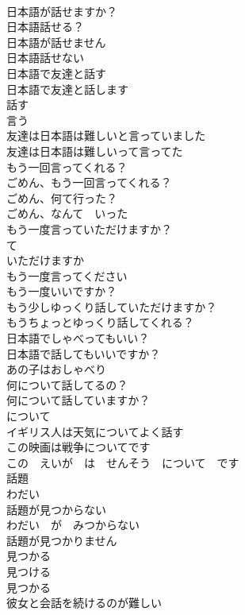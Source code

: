 \documentclass[8pt]{extreport}
\begin{document}
\begin{CJK}{UTF8}{min}
\\	日本語が話せますか？	
\\	日本語話せる？	
\\	日本語が話せません	
\\	日本語話せない	
\\	日本語で友達と話す	
\\	日本語で友達と話します	
\\	話す	
\\	言う	
\\	友達は日本語は難しいと言っていました	
\\	友達は日本語は難しいって言ってた	
\\	もう一回言ってくれる？	
\\	ごめん、もう一回言ってくれる？	
\\	ごめん、何て行った？	
\\	ごめん、なんて　いった
\\	もう一度言っていただけますか？	
\\	て
\\	いただけますか 
\\	もう一度言ってください	
\\	もう一度いいですか？	
\\	もう少しゆっくり話していただけますか？	
\\	もうちょっとゆっくり話してくれる？	
\\	日本語でしゃべってもいい？	
\\	日本語で話してもいいですか？	
\\	あの子はおしゃべり	
\\	何について話してるの？	
\\	何について話していますか？	
\\	について 
\\	イギリス人は天気についてよく話す	
\\	この映画は戦争についてです	
\\	この　えいが　は　せんそう　について　です
\\	話題	
\\	わだい
\\	話題が見つからない	
\\	わだい　が　みつからない
\\	話題が見つかりません	
\\	見つかる	
\\	見つける 
\\	見つかる 
\\	彼女と会話を続けるのが難しい	

\end{CJK}
\end{document}
